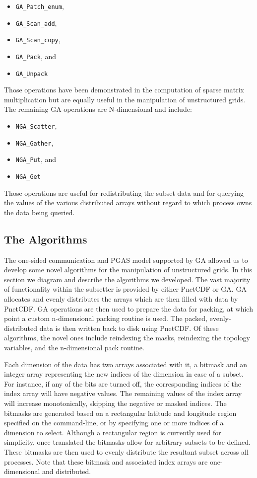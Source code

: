 \begin{itemize}
\item \verb=GA_Patch_enum=,
\item \verb=GA_Scan_add=,
\item \verb=GA_Scan_copy=,
\item \verb=GA_Pack=, and
\item \verb=GA_Unpack=
\end{itemize}

Those operations have been demonstrated in the computation of sparse matrix
multiplication\cite{GA} but are equally useful in the manipulation of
unstructured grids.  The remaining GA operations are N-dimensional and
include:

\begin{itemize}
\item \verb=NGA_Scatter=,
\item \verb=NGA_Gather=,
\item \verb=NGA_Put=, and
\item \verb=NGA_Get=
\end{itemize}

Those operations are useful for redistributing the subset data and for
querying the values of the various distributed arrays without regard to which
process owns the data being queried.

\subsection{The Algorithms}

The one-sided communication and PGAS model supported by GA allowed us to
develop some novel algorithms for the manipulation of unstructured grids.  In
this section we diagram and describe the algorithms we developed.  The vast
majority of functionality within the subsetter is provided by either PnetCDF
or GA.  GA allocates and evenly distributes the arrays which are then filled
with data by PnetCDF.  GA operations are then used to prepare the data for
packing, at which point a custom n-dimensional packing routine is used.  The
packed, evenly-distributed data is then written back to disk using PnetCDF.
Of these algorithms, the novel ones include reindexing the masks, reindexing
the topology variables, and the n-dimensional pack routine.

Each dimension of the data has two arrays associated with it, a bitmask and an
integer array representing the new indices of the dimension in case of a
subset.  For instance, if any of the bits are turned off, the corresponding
indices of the index array will have negative values.  The remaining values of
the index array will increase monotonically, skipping the negative or masked
indices.  The bitmasks are generated based on a rectangular latitude and
longitude region specified on the command-line, or by specifying one or more
indices of a dimension to select.  Although a rectangular region is currently
used for simplicity, once translated the bitmasks allow for arbitrary subsets
to be defined.  These bitmasks are then used to evenly distribute the
resultant subset across all processes.  Note that these bitmask and associated
index arrays are one-dimensional and distributed.

